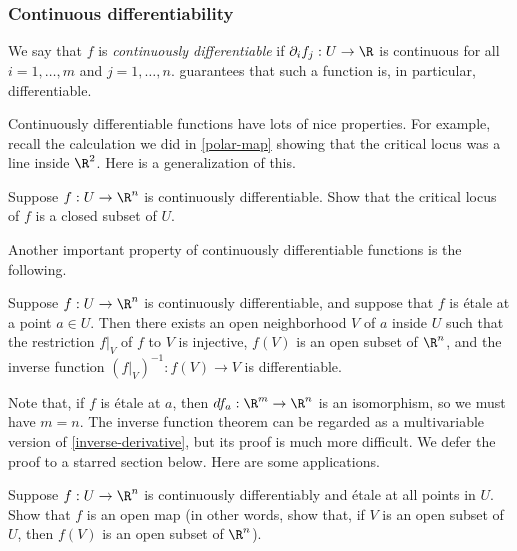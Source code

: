 \subsubsection*{Continuous differentiability}

\begin{definition}
	We say that $f$ is \emph{continuously differentiable} if $\partial_i f_j : U \to \R$ is continuous for all $i = 1, \dotsc, m$ and $j = 1, \dotsc, n$.  guarantees that such a function is, in particular, differentiable. 
\end{definition}

Continuously differentiable functions have lots of nice properties. For example, recall the calculation we did in \cref{polar-map} showing that the critical locus was a line inside $\R^2$. Here is a generalization of this. 

\begin{exercise}
	Suppose $f : U \to \R^n$ is continuously differentiable. Show that the critical locus of $f$ is a closed subset of $U$.
\end{exercise}

Another important property of continuously differentiable functions is the following.

\begin{theorem} \label{inverse-function-theorem}
	Suppose $f : U \to \R^n$ is continuously differentiable, and suppose that $f$ is \'etale at a point $a \in U$. Then there exists an open neighborhood $V$ of $a$ inside $U$ such that the restriction $f|_{V}$ of $f$ to $V$ is injective, $f(V)$ is an open subset of $\R^n$, and the inverse function $(f|_V)^{-1} : f(V) \to V$ is differentiable. 
\end{theorem}

Note that, if $f$ is \'etale at $a$, then $df_a : \R^m \to \R^n$ is an isomorphism, so we must have $m = n$. The inverse function theorem can be regarded as a multivariable version of \cref{inverse-derivative}, but its proof is much more difficult. We defer the proof to a starred section below. Here are some applications. 

\begin{exercise} \label{etale-open}
	Suppose $f :  U \to \R^n$ is continuously differentiably and \'etale at all points in $U$. Show that $f$ is an open map (in other words, show that, if $V$ is an open subset of $U$, then $f(V)$ is an open subset of $\R^n$). 
\end{exercise}

